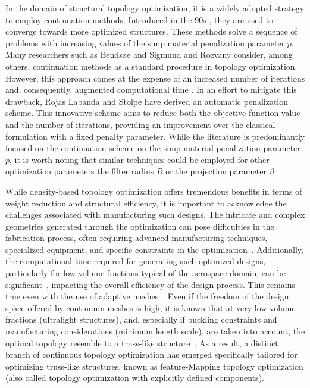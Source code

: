 In the domain of structural topology optimization, it is a widely adopted strategy to employ continuation methods. Introduced in the 90s , they are used to converge towards more optimized structures. These methods solve a sequence of problems with increasing values of the \gls{simp} material penalization parameter $p$. Many researchers such as Bendsøe and Sigmund  and Rozvany  consider, among others, continuation methods as a standard procedure in topology optimization. However, this approach comes at the expense of an increased number of iterations and, consequently, augmented computational time . In an effort to mitigate this drawback, Rojas Labanda and Stolpe  have derived an automatic penalization scheme. This innovative scheme aims to reduce both the objective function value and the number of iterations, providing an improvement over the classical formulation with a fixed penalty parameter. While the literature is predominantly focused on the continuation scheme on the \gls{simp} material penalization parameter $p$, it is worth noting that similar techniques could be employed for other optimization parameters \eg the filter radius $R$ or the projection parameter $\beta$.

While density-based topology optimization offers tremendous benefits in terms of weight reduction and structural efficiency, it is important to acknowledge the challenges associated with manufacturing such designs. The intricate and complex geometries generated through the optimization can pose difficulties in the fabrication process, often requiring advanced manufacturing techniques, specialized equipment, and specific constraints in the optimization~. Additionally, the computational time required for generating such optimized designs, particularly for low volume fractions typical of the aerospace domain, can be significant~, impacting the overall efficiency of the design process. This remains true even with the use of adaptive meshes~. Even if the freedom of the design space offered by continuum meshes is high, it is known that at very low volume fractions (\eg ultralight structures), and, especially if buckling constraints and manufacturing considerations (\eg minimum length scale), are taken into account, the optimal topology resemble to a truss-like structure~. As a result, a distinct branch of continuous topology optimization has emerged specifically tailored for optimizing truss-like structures, known as feature-Mapping topology optimization (also called topology optimization with explicitly defined components).

